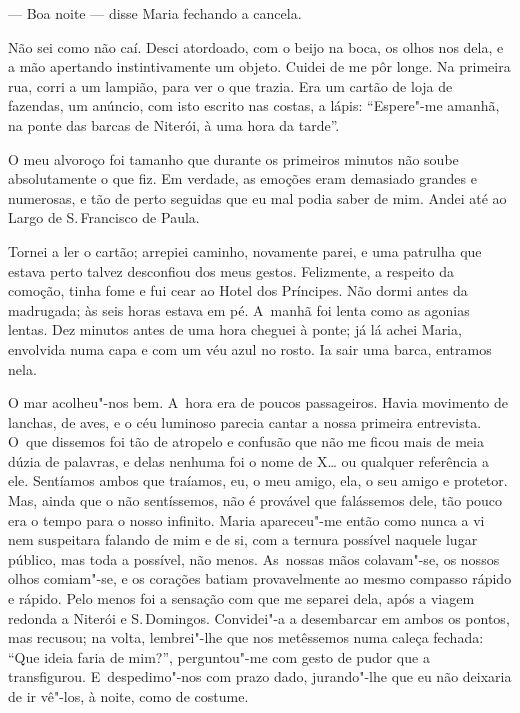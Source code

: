 \begin{linenumbers}
--- Boa noite --- disse Maria fechando a cancela.

Não sei como não caí. Desci atordoado, com o beijo na boca, os olhos nos
dela, e a mão apertando instintivamente um objeto. Cuidei de me pôr
longe. Na primeira rua, corri a um lampião, para ver o que trazia. Era
um cartão de loja de fazendas, um anúncio, com isto escrito nas costas,
a lápis: ``Espere"-me amanhã, na ponte das barcas de Niterói, à uma hora
da tarde''.

O meu alvoroço foi tamanho que durante os primeiros minutos não soube
absolutamente o que fiz. Em verdade, as emoções eram demasiado grandes e
numerosas, e tão de perto seguidas que eu mal podia saber de mim. Andei
até ao Largo de S.\,Francisco de Paula.

Tornei a ler o cartão; arrepiei caminho, novamente parei, e uma patrulha
que estava perto talvez desconfiou dos meus gestos. Felizmente, a
respeito da comoção, tinha fome e fui cear ao Hotel dos Príncipes. Não
dormi antes da madrugada; às seis horas estava em pé. A~manhã foi lenta
como as agonias lentas. Dez minutos antes de uma hora cheguei à ponte;
já lá achei Maria, envolvida numa capa e com um véu azul no rosto. Ia
sair uma barca, entramos nela.

O mar acolheu"-nos bem. A~hora era de poucos passageiros. Havia movimento
de lanchas, de aves, e o céu luminoso parecia cantar a nossa primeira
entrevista. O~que dissemos foi tão de atropelo e confusão que não me
ficou mais de meia dúzia de palavras, e delas nenhuma foi o nome de X\ldots{}
ou qualquer referência a ele. Sentíamos ambos que traíamos, eu, o meu
amigo, ela, o seu amigo e protetor. Mas, ainda que o não sentíssemos,
não é provável que falássemos dele, tão pouco era o tempo para o nosso
infinito. Maria apareceu"-me então como nunca a vi nem suspeitara falando
de mim e de si, com a ternura possível naquele lugar público, mas toda a
possível, não menos. As~nossas mãos colavam"-se, os nossos olhos
comiam"-se, e os corações batiam provavelmente ao mesmo compasso rápido e
rápido. Pelo menos foi a sensação com que me separei dela, após a viagem
redonda a Niterói e S.\,Domingos. Convidei"-a a desembarcar em ambos os
pontos, mas recusou; na volta, lembrei"-lhe que nos metêssemos numa
caleça fechada: ``Que ideia faria de mim?'', perguntou"-me com gesto de
pudor que a transfigurou. E~despedimo"-nos com prazo dado, jurando"-lhe
que eu não deixaria de ir vê"-los, à noite, como de costume.


\end{linenumbers}
